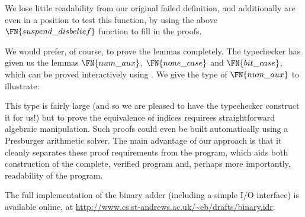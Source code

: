 We lose little readability from our original failed definition, and
additionally are even in a position to test this function, by using
the above $\FN{suspend\_disbelief}$ function to fill in the proofs.

We would prefer, of course, to prove the lemmas completely. The
typechecker has given us the lemmas $\FN{num\_aux}$, $\FN{none\_case}$
and $\FN{bit\_case}$, which can be proved interactively using
\Ivor{}. We give the type of $\FN{num\_aux}$ to illustrate:


This type is fairly large (and so we are pleased to have the
typechecker construct it for us!) but to prove the
equivalence of indices requirees  straightforward algebraic
manipulation. Such proofs could even be built automatically using a
Presburger arithmetic solver. The main advantage of our approach is
that it cleanly separates these proof requirements from the program,
which aids both construction of the complete, verified program and,
perhaps more importantly, readability of the program.

The full implementation of the binary adder (including a simple I/O
interface) is available online, at
\url{http://www.cs.st-andrews.ac.uk/~eb/drafts/binary.idr}.
